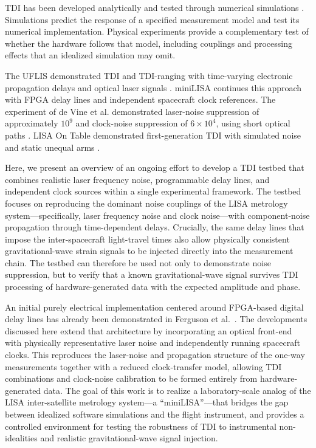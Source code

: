 \ac{TDI} has been developed analytically and tested through numerical simulations \cite{tinto_time-delay_2002,bayle_unified_2023}. Simulations predict the response of a specified measurement model and test its numerical implementation. Physical experiments provide a complementary test of whether the hardware follows that model, including couplings and processing effects that an idealized simulation may omit.

The \ac{UFLIS} demonstrated TDI and TDI-ranging with time-varying electronic propagation delays and optical laser signals \cite{mitryk_hardware-based_2012}. miniLISA continues this approach with FPGA delay lines and independent spacecraft clock references. The experiment of de Vine et al. demonstrated laser-noise suppression of approximately $10^9$ and clock-noise suppression of $6\times10^4$, using short optical paths \cite{devine2010}. LISA On Table demonstrated first-generation TDI with simulated noise and static unequal arms \cite{laporte2017lot}.


Here, we present an overview of an ongoing effort to develop a \ac{TDI} testbed that combines realistic laser frequency noise, programmable delay lines, and independent clock sources within a single experimental framework. The testbed focuses on reproducing the dominant noise couplings of the LISA metrology system—specifically, laser frequency noise and clock noise—with component-noise propagation through time-dependent delays. Crucially, the same delay lines that impose the inter-spacecraft light-travel times also allow physically consistent gravitational-wave strain signals to be injected directly into the measurement chain. The testbed can therefore be used not only to demonstrate noise suppression, but to verify that a known gravitational-wave signal survives \ac{TDI} processing of hardware-generated data with the expected amplitude and phase.

An initial purely electrical implementation centered around \ac{FPGA}-based digital delay lines has already been demonstrated in Ferguson et al.~\cite{ferguson2025applying}. The developments discussed here extend that architecture by incorporating an optical front-end with physically representative laser noise and independently running spacecraft clocks. This reproduces the laser-noise and propagation structure of the one-way measurements together with a reduced clock-transfer model, allowing \ac{TDI} combinations and clock-noise calibration to be formed entirely from hardware-generated data. The goal of this work is to realize a laboratory-scale analog of the LISA inter-satellite metrology system—a “miniLISA”—that bridges the gap between idealized software simulations and the flight instrument, and provides a controlled environment for testing the robustness of \ac{TDI} to instrumental non-idealities and realistic gravitational-wave signal injection.

